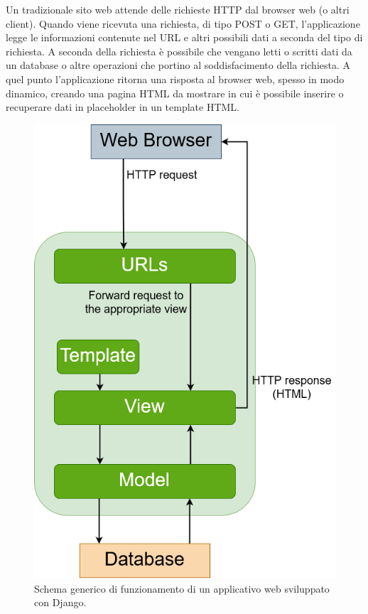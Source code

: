Un tradizionale sito web attende delle richieste HTTP dal browser web (o altri client). Quando viene ricevuta una richiesta, di tipo POST o GET, l'applicazione 
legge le informazioni contenute nel URL e altri possibili dati a seconda del tipo di richiesta. A seconda della richiesta è possibile che vengano letti o 
scritti dati da un database o altre operazioni che portino al soddisfacimento della richiesta. A quel punto l'applicazione ritorna una risposta al browser 
web, spesso in modo dinamico, creando una pagina HTML da mostrare in cui è possibile inserire o recuperare dati in placeholder in un template HTML.
%
\newpage
%
\begin{figure}[ht!]
    \centering
    \includegraphics[scale=0.3]{images/Django_doc.png}
    \caption{Schema generico di funzionamento di un applicativo web sviluppato con Django.}
    \label{fig:django_doc}
\end{figure}
